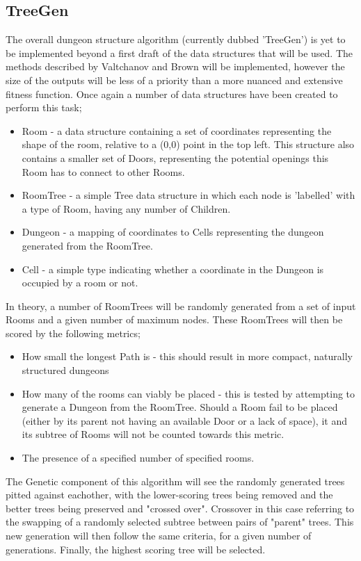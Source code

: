 \documentclass{article}
\begin{document}
\subsection{TreeGen}
The overall dungeon structure algorithm (currently dubbed 'TreeGen') is yet to be implemented beyond a first draft of the data structures that will be used. The methods described by Valtchanov and Brown\cite{genetic} will be implemented, however the size of the outputs will be less of a priority than a more nuanced and extensive fitness function. Once again a number of data structures have been created to perform this task;
\begin{itemize}
    \item Room - a data structure containing a set of coordinates representing the shape of the room, relative to a (0,0) point in the top left. This structure also contains a smaller set of Doors, representing the potential openings this Room has to connect to other Rooms.
    \item RoomTree - a simple Tree data structure in which each node is 'labelled' with a type of Room, having any number of Children.
    \item Dungeon - a mapping of coordinates to Cells representing the dungeon generated from the RoomTree.
    \item Cell - a simple type indicating whether a coordinate in the Dungeon is occupied by a room or not.
\end{itemize}



In theory, a number of RoomTrees will be randomly generated from a set of input Rooms and a given number of maximum nodes. These RoomTrees will then be scored by the following metrics; \begin{itemize}
    \item How small the longest Path is - this should result in more compact, naturally structured dungeons
    \item How many of the rooms can viably be placed - this is tested by attempting to generate a Dungeon from the RoomTree. Should a Room fail to be placed (either by its parent not having an available Door or a lack of space), it and its subtree of Rooms will not be counted towards this metric. 
    \item The presence of a specified number of specified rooms.
\end{itemize}
The Genetic component of this algorithm will see the randomly generated trees pitted against eachother, with the lower-scoring trees being removed and the better trees being preserved and "crossed over". Crossover in this case referring to the swapping of a randomly selected subtree between pairs of "parent" trees. This new generation will then follow the same criteria, for a given number of generations. Finally, the highest scoring tree will be selected.
\end{document}
